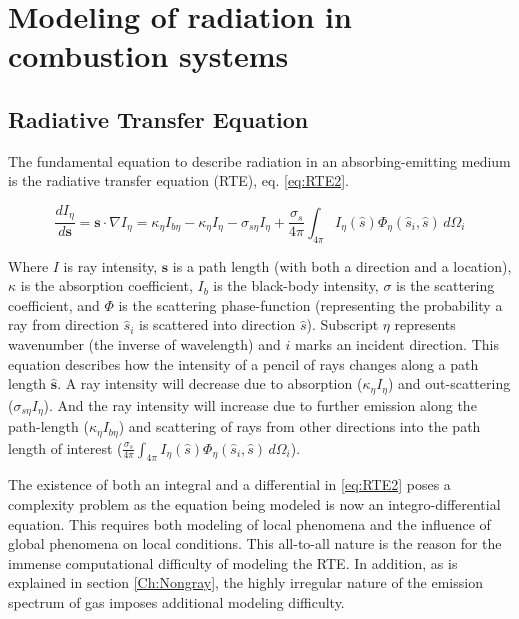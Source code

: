 \addchapheadtotoc
\chapter{Modeling of radiation in combustion systems}\label{chapter:models_and_methods}



\section{Radiative Transfer Equation}
The fundamental equation to describe radiation in an absorbing-emitting medium is the radiative transfer equation (RTE), eq. \ref{eq:RTE2}.

\begin{equation}
    \frac{dI_\eta{}}{d\textbf{s}} = \textbf{s} \cdot \nabla{I_\eta{}} = \kappa{}_\eta{}I_{b\eta{}}-\kappa{}_\eta{}I_\eta{}-\sigma{}_{s\eta{}}I_\eta{}+\frac{\sigma{}_s}{4\pi}\int_{4\pi{}}{I_\eta{}(\hat{s})\Phi_\eta{}(\hat{s}_i,\hat{s})}\,d\Omega{}_i
    \label{eq:RTE2}
\end{equation}

Where $I$ is ray intensity, $\textbf{s}$ is a path length (with both a direction and a location), $\kappa{}$ is the absorption coefficient, $I_b$ is the black-body intensity, $\sigma{}$ is the scattering coefficient, and $\Phi{}$ is the scattering phase-function (representing the probability a ray from direction $\hat{s}_i$ is scattered into direction $\hat{s}$). Subscript $\eta{}$ represents wavenumber (the inverse of wavelength) and $i$ marks an incident direction. This equation describes how the intensity of a pencil of rays changes along a path length $\hat{\textbf{s}}$. A ray intensity will decrease due to absorption ($\kappa{}_\eta{}I_\eta{}$) and out-scattering ($\sigma{}_{s\eta{}}I_\eta{}$). And the ray intensity will increase due to further emission along the path-length ($\kappa{}_\eta{}I_{b\eta{}}$) and scattering of rays from other directions into the path length of interest ($\frac{\sigma{}_s}{4\pi}\int_{4\pi{}}{I_\eta{}(\hat{s})\Phi_\eta{}(\hat{s}_i,\hat{s})}\,d\Omega{}_i$). 

The existence of both an integral and a differential in \ref{eq:RTE2} poses a complexity problem as the equation being modeled is now an integro-differential equation. This requires both modeling of local phenomena and the influence of global phenomena on local conditions. This all-to-all nature is the reason for the immense computational difficulty of modeling the RTE. In addition, as is explained in section \ref{Ch:Nongray}, the highly irregular nature of the emission spectrum of gas imposes additional modeling difficulty.

